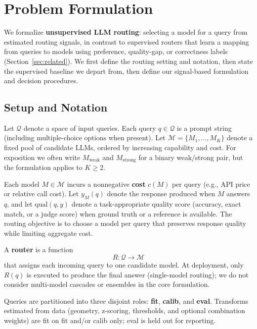 \section{Problem Formulation}
\label{sec:problem}

We formalize \textbf{unsupervised LLM routing}: selecting a model for a query from estimated routing signals, in contrast to supervised routers that learn a mapping from queries to models using preference, quality-gap, or correctness labels (Section~\ref{sec:related}).
We first define the routing setting and notation, then state the supervised baseline we depart from, then define our signal-based formulation and decision procedures.

\subsection{Setup and Notation}
\label{sec:setup}

Let $\mathcal{Q}$ denote a space of input queries.
Each query $q\in\mathcal{Q}$ is a prompt string (including multiple-choice options when present).
Let $\mathcal{M}=\{M_1,\ldots,M_K\}$ denote a fixed pool of candidate LLMs, ordered by increasing capability and cost.
For exposition we often write $M_{\mathrm{weak}}$ and $M_{\mathrm{strong}}$ for a binary weak/strong pair, but the formulation applies to $K\ge 2$.

Each model $M\in\mathcal{M}$ incurs a nonnegative \textbf{cost} $c(M)$ per query (e.g., API price or relative call cost).
Let $y_M(q)$ denote the response produced when $M$ answers $q$, and let $\mathrm{qual}(q,y)$ denote a task-appropriate quality score (accuracy, exact match, or a judge score) when ground truth or a reference is available.
The routing objective is to choose a model per query that preserves response quality while limiting aggregate cost.

A \textbf{router} is a function
\begin{equation}
R:\mathcal{Q}\to\mathcal{M}
\end{equation}
that assigns each incoming query to one candidate model.
At deployment, only $R(q)$ is executed to produce the final answer (single-model routing); we do not consider multi-model cascades or ensembles in the core formulation.

Queries are partitioned into three disjoint roles: \textbf{fit}, \textbf{calib}, and \textbf{eval}.
Transforms estimated from data (geometry, z-scoring, thresholds, and optional combination weights) are fit on fit and/or calib only; eval is held out for reporting.


